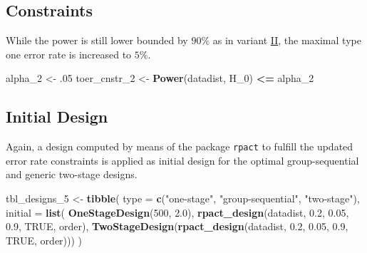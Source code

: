 \documentclass[
]{book}
\newenvironment{Shaded}{\begin{snugshade}}{\end{snugshade}}
\newcommand{\DataTypeTok}[1]{\textcolor[rgb]{0.13,0.29,0.53}{#1}}
\newcommand{\DecValTok}[1]{\textcolor[rgb]{0.00,0.00,0.81}{#1}}
\newcommand{\FloatTok}[1]{\textcolor[rgb]{0.00,0.00,0.81}{#1}}
\newcommand{\KeywordTok}[1]{\textcolor[rgb]{0.13,0.29,0.53}{\textbf{#1}}}
\newcommand{\NormalTok}[1]{#1}
\newcommand{\OperatorTok}[1]{\textcolor[rgb]{0.81,0.36,0.00}{\textbf{#1}}}
\newcommand{\OtherTok}[1]{\textcolor[rgb]{0.56,0.35,0.01}{#1}}
\newcommand{\StringTok}[1]{\textcolor[rgb]{0.31,0.60,0.02}{#1}}
\begin{document}
\hypertarget{constraints-9}{%
\subsection{Constraints}\label{constraints-9}}

While the power is still lower bounded by \(90\%\) as in variant \protect\hyperlink{variantIV_2}{II},
the maximal type one error rate is increased to \(5\%\).

\begin{Shaded}
\begin{Highlighting}[]
\NormalTok{alpha_}\DecValTok{2}\NormalTok{      <-}\StringTok{ }\FloatTok{.05}
\NormalTok{toer_cnstr_}\DecValTok{2}\NormalTok{ <-}\StringTok{ }\KeywordTok{Power}\NormalTok{(datadist, H_}\DecValTok{0}\NormalTok{) }\OperatorTok{<=}\StringTok{ }\NormalTok{alpha_}\DecValTok{2}
\end{Highlighting}
\end{Shaded}

\hypertarget{initial-design-7}{%
\subsection{Initial Design}\label{initial-design-7}}

Again, a design computed by means of the package \texttt{rpact} to fulfill
the updated error rate constraints is applied as initial design for the
optimal group-sequential and generic two-stage designs.

\begin{Shaded}
\begin{Highlighting}[]
\NormalTok{tbl_designs_}\DecValTok{5}\NormalTok{ <-}\StringTok{ }\KeywordTok{tibble}\NormalTok{(}
    \DataTypeTok{type    =} \KeywordTok{c}\NormalTok{(}\StringTok{"one-stage"}\NormalTok{, }\StringTok{"group-sequential"}\NormalTok{, }\StringTok{"two-stage"}\NormalTok{),}
    \DataTypeTok{initial =} \KeywordTok{list}\NormalTok{(}
        \KeywordTok{OneStageDesign}\NormalTok{(}\DecValTok{500}\NormalTok{, }\FloatTok{2.0}\NormalTok{),}
        \KeywordTok{rpact_design}\NormalTok{(datadist, }\FloatTok{0.2}\NormalTok{, }\FloatTok{0.05}\NormalTok{, }\FloatTok{0.9}\NormalTok{, }\OtherTok{TRUE}\NormalTok{, order),}
        \KeywordTok{TwoStageDesign}\NormalTok{(}\KeywordTok{rpact_design}\NormalTok{(datadist, }\FloatTok{0.2}\NormalTok{, }\FloatTok{0.05}\NormalTok{, }\FloatTok{0.9}\NormalTok{, }\OtherTok{TRUE}\NormalTok{, order))) )}
\end{Highlighting}
\end{Shaded}
\end{document}
